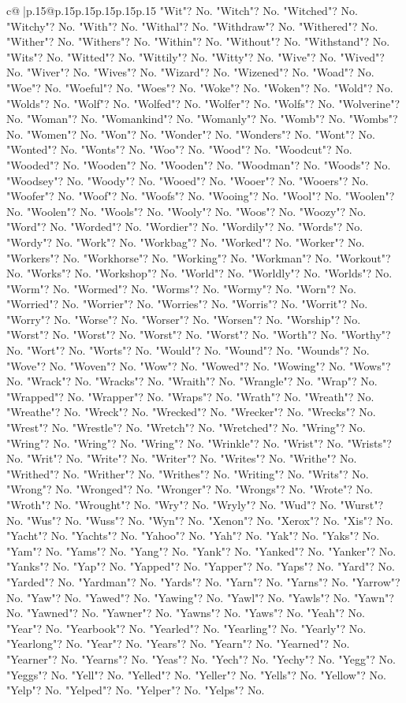 \documentclass{article}
\begin{document}
{\begin{supertabular}{c@{$\;$}|p{.15\linewidth}@{}p{.15\linewidth}p{.15\linewidth}p{.15\linewidth}p{.15\linewidth}p{.15\linewidth}}
{{{"Wit"? No. "Witch"? No. "Witched"? No. "Witchy"? No. "With"? No. "Withal"? No. "Withdraw"? No. "Withered"? No. "Wither"? No. "Withers"? No. "Within"? No. "Without"? No. "Withstand"? No. "Wits"? No. "Witted"? No. "Wittily"? No. "Witty"? No. "Wive"? No. "Wived"? No. "Wiver"? No. "Wives"? No. "Wizard"? No. "Wizened"? No. "Woad"? No. "Woe"? No. "Woeful"? No. "Woes"? No. "Woke"? No. "Woken"? No. "Wold"? No. "Wolds"? No. "Wolf"? No. "Wolfed"? No. "Wolfer"? No. "Wolfs"? No. "Wolverine"? No. "Woman"? No. "Womankind"? No. "Womanly"? No. "Womb"? No. "Wombs"? No. "Women"? No. "Won"? No. "Wonder"? No. "Wonders"? No. "Wont"? No. "Wonted"? No. "Wonts"? No. "Woo"? No. "Wood"? No. "Woodcut"? No. "Wooded"? No. "Wooden"? No. "Wooden"? No. "Woodman"? No. "Woods"? No. "Woodsey"? No. "Woody"? No. "Wooed"? No. "Wooer"? No. "Wooers"? No. "Woofer"? No. "Woof"? No. "Woofs"? No. "Wooing"? No. "Wool"? No. "Woolen"? No. "Woolen"? No. "Wools"? No. "Wooly"? No. "Woos"? No. "Woozy"? No. "Word"? No. "Worded"? No. "Wordier"? No. "Wordily"? No. "Words"? No. "Wordy"? No. "Work"? No. "Workbag"? No. "Worked"? No. "Worker"? No. "Workers"? No. "Workhorse"? No. "Working"? No. "Workman"? No. "Workout"? No. "Works"? No. "Workshop"? No. "World"? No. "Worldly"? No. "Worlds"? No. "Worm"? No. "Wormed"? No. "Worms"? No. "Wormy"? No. "Worn"? No. "Worried"? No. "Worrier"? No. "Worries"? No. "Worris"? No. "Worrit"? No. "Worry"? No. "Worse"? No. "Worser"? No. "Worsen"? No. "Worship"? No. "Worst"? No. "Worst"? No. "Worst"? No. "Worst"? No. "Worth"? No. "Worthy"? No. "Wort"? No. "Worts"? No. "Would"? No. "Wound"? No. "Wounds"? No. "Wove"? No. "Woven"? No. "Wow"? No. "Wowed"? No. "Wowing"? No. "Wows"? No. "Wrack"? No. "Wracks"? No. "Wraith"? No. "Wrangle"? No. "Wrap"? No. "Wrapped"? No. "Wrapper"? No. "Wraps"? No. "Wrath"? No. "Wreath"? No. "Wreathe"? No. "Wreck"? No. "Wrecked"? No. "Wrecker"? No. "Wrecks"? No. "Wrest"? No. "Wrestle"? No. "Wretch"? No. "Wretched"? No. "Wring"? No. "Wring"? No. "Wring"? No. "Wring"? No. "Wrinkle"? No. "Wrist"? No. "Wrists"? No. "Writ"? No. "Write"? No. "Writer"? No. "Writes"? No. "Writhe"? No. "Writhed"? No. "Writher"? No. "Writhes"? No. "Writing"? No. "Writs"? No. "Wrong"? No. "Wronged"? No. "Wronger"? No. "Wrongs"? No. "Wrote"? No. "Wroth"? No. "Wrought"? No. "Wry"? No. "Wryly"? No. "Wud"? No. "Wurst"? No. "Wus"? No. "Wuss"? No. "Wyn"? No. "Xenon"? No. "Xerox"? No. "Xis"? No. "Yacht"? No. "Yachts"? No. "Yahoo"? No. "Yah"? No. "Yak"? No. "Yaks"? No. "Yam"? No. "Yams"? No. "Yang"? No. "Yank"? No. "Yanked"? No. "Yanker"? No. "Yanks"? No. "Yap"? No. "Yapped"? No. "Yapper"? No. "Yaps"? No. "Yard"? No. "Yarded"? No. "Yardman"? No. "Yards"? No. "Yarn"? No. "Yarns"? No. "Yarrow"? No. "Yaw"? No. "Yawed"? No. "Yawing"? No. "Yawl"? No. "Yawls"? No. "Yawn"? No. "Yawned"? No. "Yawner"? No. "Yawns"? No. "Yaws"? No. "Yeah"? No. "Year"? No. "Yearbook"? No. "Yearled"? No. "Yearling"? No. "Yearly"? No. "Yearlong"? No. "Year"? No. "Years"? No. "Yearn"? No. "Yearned"? No. "Yearner"? No. "Yearns"? No. "Yeas"? No. "Yech"? No. "Yechy"? No. "Yegg"? No. "Yeggs"? No. "Yell"? No. "Yelled"? No. "Yeller"? No. "Yells"? No. "Yellow"? No. "Yelp"? No. "Yelped"? No. "Yelper"? No. "Yelps"? No. }}}
\end{supertabular}}
\end{document}

